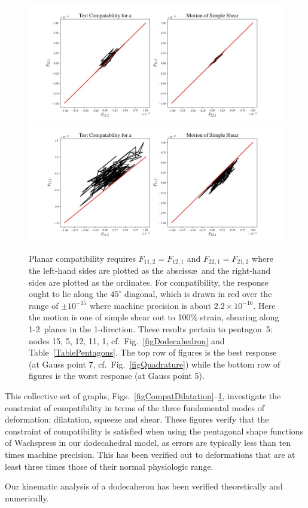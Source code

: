 \begin{figure}
	\centering
	\includegraphics[width=\textwidth]{figures/compatibilitySimpleShearP5G7.jpg}
	\includegraphics[width=\textwidth]{figures/compatibilitySimpleShearP5G5.jpg}
	\caption{Planar compatibility requires $F_{11,2} = F_{12,1}$ and $F_{22,1} = F_{21,2}$ where the left-hand sides are plotted as the absciss\ae\ and the right-hand sides are plotted as the ordinates.  For compatibility, the response ought to lie along the $45^{\circ}$ diagonal, which is drawn in red over the range of $\pm 10^{-15}$ where machine precision is about $2.2 \times 10^{-16}$.  Here the motion is one of simple shear out to 100\% strain, shearing along 1-2~planes in the 1-direction.  These results pertain to pentagon~5: nodes 15, 5, 12, 11, 1, cf.\ Fig.~\ref{figDodecahedron} and Table~\ref{TablePentagons}.  The top row of figures is the best response (at Gauss point 7, cf.\ Fig.~\ref{figQuadrature}) while the bottom row of figures is the worst response (at Gauss point 5).}
	\label{figCompatSimpleShearP5}
\end{figure}

This collective set of graphs, Figs.~\ref{figCompatDilatation}--\ref{figCompatSimpleShearP5}, investigate the constraint of compatibility in terms of the three fundamental modes of deformation: dilatation, squeeze and shear.  These figures verify that the constraint of compatibility is satisfied when using the pentagonal shape functions of Wachspress \cite{Wachspress75,Wachspress16} in our dodecahedral model, as errors are typically less than ten times machine precision.  This has been verified out to deformations that are at least three times those of their normal physiologic range.

Our kinematic analysis of a dodecaheron has been verified theoretically and numerically.


